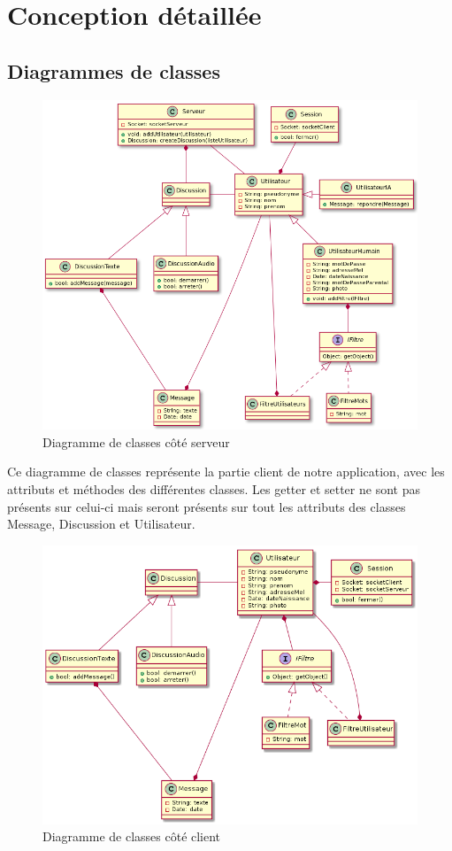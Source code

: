 \documentclass[a4paper,12pt]{article}
\begin{document}
	\section{Conception détaillée}

	\subsection{Diagrammes de classes}

	\begin{figure}[H]
		\centerline{\includegraphics[width=16.5cm]{../diagrammes/img/classesServeur.png}}
		\caption{Diagramme de classes côté serveur}
	\end{figure}

	Ce diagramme de classes représente la partie client de notre application, avec les attributs et méthodes des différentes classes.
	Les getter et setter ne sont pas présents sur celui-ci mais seront présents sur tout les attributs des classes Message, Discussion et Utilisateur.
	\begin{figure}[H]
		\centerline{\includegraphics[width=16.5cm]{../diagrammes/img/classesClient.png}}
		\caption{Diagramme de classes côté client}
	\end{figure}
\end{document}
